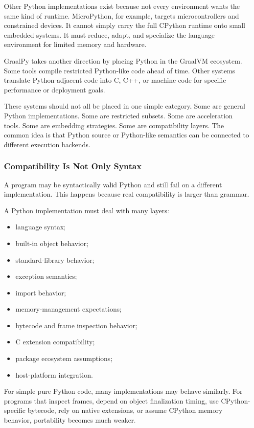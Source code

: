 Other Python implementations exist because not every environment wants the same kind of runtime. MicroPython, for example, targets microcontrollers and constrained devices. It cannot simply carry the full CPython runtime onto small embedded systems. It must reduce, adapt, and specialize the language environment for limited memory and hardware.

GraalPy takes another direction by placing Python in the GraalVM ecosystem. Some tools compile restricted Python-like code ahead of time. Other systems translate Python-adjacent code into C, C++, or machine code for specific performance or deployment goals.

These systems should not all be placed in one simple category. Some are general Python implementations. Some are restricted subsets. Some are acceleration tools. Some are embedding strategies. Some are compatibility layers. The common idea is that Python source or Python-like semantics can be connected to different execution backends.

\subsubsection{Compatibility Is Not Only Syntax}

A program may be syntactically valid Python and still fail on a different implementation. This happens because real compatibility is larger than grammar.

A Python implementation must deal with many layers:

\begin{itemize}
    \item language syntax;
    \item built-in object behavior;
    \item standard-library behavior;
    \item exception semantics;
    \item import behavior;
    \item memory-management expectations;
    \item bytecode and frame inspection behavior;
    \item C extension compatibility;
    \item package ecosystem assumptions;
    \item host-platform integration.
\end{itemize}

For simple pure Python code, many implementations may behave similarly. For programs that inspect frames, depend on object finalization timing, use CPython-specific bytecode, rely on native extensions, or assume CPython memory behavior, portability becomes much weaker.

